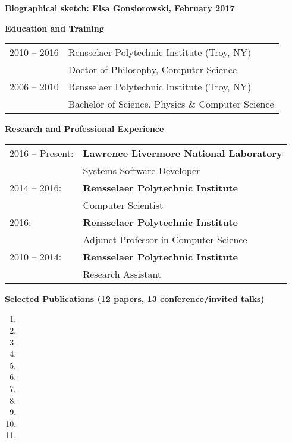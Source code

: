 \documentclass[times,11pt]{article}    %
\begin{document}
\begin{center}
\textbf{\sffamily\large Biographical sketch: Elsa Gonsiorowski, February 2017}
\end{center}

\vskip 3pt
\textbf{\sffamily Education and Training}
\vskip 3pt

\begin{tabular}{ll}
\\
2010 -- 2016 & Rensselaer Polytechnic Institute (Troy, NY)\\
             & Doctor of Philosophy, Computer Science\\
2006 -- 2010 & Rensselaer Polytechnic Institute (Troy, NY)\\
             & Bachelor of Science, Physics \& Computer Science\\
\end{tabular}

\vskip 3pt
\textbf{\sffamily Research and Professional Experience}
\vskip 3pt

\begin{tabular}{ll}
2016 -- Present: & 
\textbf{Lawrence Livermore National Laboratory}\\
 & Systems Software Developer \\

2014 -- 2016: &
\textbf{Rensselaer Polytechnic Institute}\\
 & Computer Scientist \\

2016: & 
\textbf{Rensselaer Polytechnic Institute}\\
 & Adjunct Professor in Computer Science \\

2010 -- 2014: & 
\textbf{Rensselaer Polytechnic Institute}\\
 & Research Assistant \\
\end{tabular}

\vskip 3pt
\textbf{\sffamily Selected Publications (12 papers, 13 conference/invited talks)}

\begin{enumerate}
\item {}
\item {}
\item {}
\item {}
\item {}
\item {}
\item {}
\item {}
\item {}
\item {}
\item {}
\end{enumerate}
\end{document}
